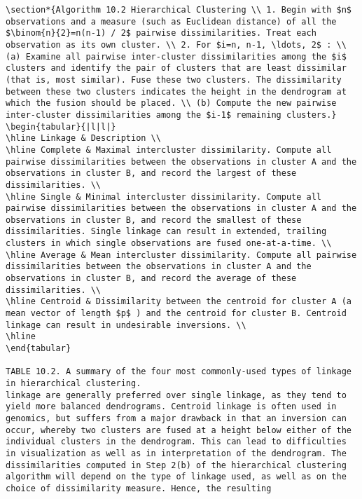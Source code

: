 \documentclass[10pt]{article}
\begin{document}
\begin{verbatim}
\section*{Algorithm 10.2 Hierarchical Clustering \\ 1. Begin with $n$ observations and a measure (such as Euclidean distance) of all the $\binom{n}{2}=n(n-1) / 2$ pairwise dissimilarities. Treat each observation as its own cluster. \\ 2. For $i=n, n-1, \ldots, 2$ : \\ (a) Examine all pairwise inter-cluster dissimilarities among the $i$ clusters and identify the pair of clusters that are least dissimilar (that is, most similar). Fuse these two clusters. The dissimilarity between these two clusters indicates the height in the dendrogram at which the fusion should be placed. \\ (b) Compute the new pairwise inter-cluster dissimilarities among the $i-1$ remaining clusters.}
\begin{tabular}{|l|l|}
\hline Linkage & Description \\
\hline Complete & Maximal intercluster dissimilarity. Compute all pairwise dissimilarities between the observations in cluster A and the observations in cluster B, and record the largest of these dissimilarities. \\
\hline Single & Minimal intercluster dissimilarity. Compute all pairwise dissimilarities between the observations in cluster A and the observations in cluster B, and record the smallest of these dissimilarities. Single linkage can result in extended, trailing clusters in which single observations are fused one-at-a-time. \\
\hline Average & Mean intercluster dissimilarity. Compute all pairwise dissimilarities between the observations in cluster A and the observations in cluster B, and record the average of these dissimilarities. \\
\hline Centroid & Dissimilarity between the centroid for cluster A (a mean vector of length $p$ ) and the centroid for cluster B. Centroid linkage can result in undesirable inversions. \\
\hline
\end{tabular}

TABLE 10.2. A summary of the four most commonly-used types of linkage in hierarchical clustering.
linkage are generally preferred over single linkage, as they tend to yield more balanced dendrograms. Centroid linkage is often used in genomics, but suffers from a major drawback in that an inversion can occur, whereby two clusters are fused at a height below either of the individual clusters in the dendrogram. This can lead to difficulties in visualization as well as in interpretation of the dendrogram. The dissimilarities computed in Step 2(b) of the hierarchical clustering algorithm will depend on the type of linkage used, as well as on the choice of dissimilarity measure. Hence, the resulting


\end{verbatim}
\end{document}

